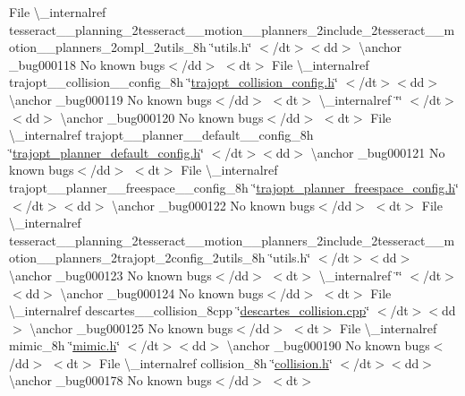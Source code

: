\begin{DoxyRefList}
\+File \textbackslash{}\+\_\+internalref tesseract\+\_\+\+\_\+planning\+\_\+2tesseract\+\_\+\+\_\+motion\+\_\+\+\_\+planners\+\_\+2include\+\_\+2tesseract\+\_\+\+\_\+motion\+\_\+\+\_\+planners\+\_\+2ompl\+\_\+2utils\+\_\+8h \char`\"{}utils.\+h\char`\"{} $<$/dt$>$$<$dd$>$ \textbackslash{}anchor \+\_\+bug000118 No known bugs$<$/dd$>$ $<$dt$>$
\+File \textbackslash{}\+\_\+internalref trajopt\+\_\+\+\_\+collision\+\_\+\+\_\+config\+\_\+8h \char`\"{}\mbox{\hyperlink{trajopt__collision__config_8h}{trajopt\+\_\+collision\+\_\+config.\+h}}\char`\"{} $<$/dt$>$$<$dd$>$ \textbackslash{}anchor \+\_\+bug000119 No known bugs$<$/dd$>$ $<$dt$>$
 \textbackslash{}\+\_\+internalref  \char`\"{}\char`\"{} $<$/dt$>$$<$dd$>$ \textbackslash{}anchor \+\_\+bug000120 No known bugs$<$/dd$>$ $<$dt$>$
\+File \textbackslash{}\+\_\+internalref trajopt\+\_\+\+\_\+planner\+\_\+\+\_\+default\+\_\+\+\_\+config\+\_\+8h \char`\"{}\mbox{\hyperlink{trajopt__planner__default__config_8h}{trajopt\+\_\+planner\+\_\+default\+\_\+config.\+h}}\char`\"{} $<$/dt$>$$<$dd$>$ \textbackslash{}anchor \+\_\+bug000121 No known bugs$<$/dd$>$ $<$dt$>$
\+File \textbackslash{}\+\_\+internalref trajopt\+\_\+\+\_\+planner\+\_\+\+\_\+freespace\+\_\+\+\_\+config\+\_\+8h \char`\"{}\mbox{\hyperlink{trajopt__planner__freespace__config_8h}{trajopt\+\_\+planner\+\_\+freespace\+\_\+config.\+h}}\char`\"{} $<$/dt$>$$<$dd$>$ \textbackslash{}anchor \+\_\+bug000122 No known bugs$<$/dd$>$ $<$dt$>$
\+File \textbackslash{}\+\_\+internalref tesseract\+\_\+\+\_\+planning\+\_\+2tesseract\+\_\+\+\_\+motion\+\_\+\+\_\+planners\+\_\+2include\+\_\+2tesseract\+\_\+\+\_\+motion\+\_\+\+\_\+planners\+\_\+2trajopt\+\_\+2config\+\_\+2utils\+\_\+8h \char`\"{}utils.\+h\char`\"{} $<$/dt$>$$<$dd$>$ \textbackslash{}anchor \+\_\+bug000123 No known bugs$<$/dd$>$ $<$dt$>$
 \textbackslash{}\+\_\+internalref  \char`\"{}\char`\"{} $<$/dt$>$$<$dd$>$ \textbackslash{}anchor \+\_\+bug000124 No known bugs$<$/dd$>$ $<$dt$>$
\+File \textbackslash{}\+\_\+internalref descartes\+\_\+\+\_\+collision\+\_\+8cpp \char`\"{}\mbox{\hyperlink{descartes__collision_8cpp}{descartes\+\_\+collision.\+cpp}}\char`\"{} $<$/dt$>$$<$dd$>$ \textbackslash{}anchor \+\_\+bug000125 No known bugs$<$/dd$>$ $<$dt$>$
\+File \textbackslash{}\+\_\+internalref mimic\+\_\+8h \char`\"{}\mbox{\hyperlink{mimic_8h}{mimic.\+h}}\char`\"{} $<$/dt$>$$<$dd$>$ \textbackslash{}anchor \+\_\+bug000190 No known bugs$<$/dd$>$ $<$dt$>$
\+File \textbackslash{}\+\_\+internalref collision\+\_\+8h \char`\"{}\mbox{\hyperlink{collision_8h}{collision.\+h}}\char`\"{} $<$/dt$>$$<$dd$>$ \textbackslash{}anchor \+\_\+bug000178 No known bugs$<$/dd$>$ $<$dt$>$

\end{DoxyRefList}
